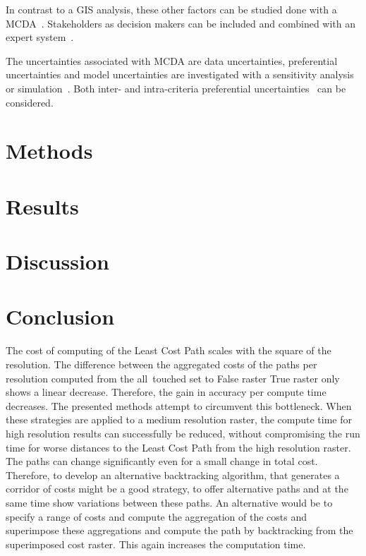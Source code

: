 \documentclass[acmtog]{acmart}
\begin{document}
	In contrast to a GIS analysis, these other factors can be studied done with a \acrfull{MCDA}~\cite{bertsch_participatory_2016}.
	Stakeholders as decision makers can be included and combined with an expert system~\cite{bertsch_participatory_2016}.
	
	The uncertainties associated with \acrshort{MCDA} are data uncertainties, preferential uncertainties and model uncertainties are investigated with a sensitivity analysis~\cite{bertsch_participatory_2016} or simulation~\cite{butler_simulation_1997}.
	Both inter- and intra-criteria preferential uncertainties~\cite{bertsch_sensitivity_2007} can be considered.
	
	\section{Methods}\label{sec:methods}
	

	\section{Results}\label{sec:results}
	
	
	\section{Discussion}\label{sec:discussion}
	
		
	\section{Conclusion}\label{sec:conclusion}
	The cost of computing of the Least Cost Path scales with the square of the resolution.
	The difference between the aggregated costs of the paths per resolution computed from the all~touched set to False raster True raster only shows a linear decrease.
	Therefore, the gain in accuracy per compute time decreases.
	The presented methods attempt to circumvent this bottleneck.
	When these strategies are applied to a medium resolution raster, the compute time for high resolution results can successfully be reduced, without compromising the run time for worse distances to the Least Cost Path from the high resolution raster.
	The paths can change significantly even for a small change in total cost.
	Therefore, to develop an alternative backtracking algorithm, that generates a corridor of costs might be a good strategy, to offer alternative paths and at the same time show variations between these paths.
	An alternative would be to specify a range of costs and compute the aggregation of the costs and superimpose these aggregations and compute the path by backtracking from the superimposed cost raster. 
	This again increases the computation time.
	
\end{document}
